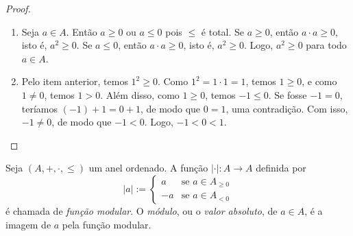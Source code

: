 \begin{proof}
\begin{enumerate}[leftmargin=*, align=left, label=\textbf{(\alph*)}]
\begin{enumerate}[label=\roman*.]
                    \item Se $a \leq 0$, então $-a \geq 0$, de modo que, como $b \geq 0$, temos $(-a) \cdot b \geq 0$, isto é, $-(a \cdot b) \geq 0$. Logo, $-(-(a \cdot b)) \leq 0$, isto é, $a \cdot b \leq 0$.
                    \item Se $a \leq 0$ e $b \leq 0$, então $-a \geq 0$ e $-b \geq 0$, de modo que $(-a) \cdot (-b) \geq 0$, isto é, $a \cdot b \geq 0$.
                \end{enumerate}
            \blackproof
            \item Seja $a \in A$. Então $a \geq 0$ ou $a \leq 0$ pois $\leq$ é total. Se $a \geq 0$, então $a \cdot a \geq 0$, isto é, $a^2 \geq 0$. Se $a \leq 0$, então $a \cdot a \geq 0$, isto é, $a^2 \geq 0$. Logo, $a^2 \geq 0$ para todo $a \in A$. \blackproof
            \item Pelo item anterior, temos $1^2 \geq 0$. Como $1^2 = 1 \cdot 1 = 1$, temos $1 \geq 0$, e como $1 \neq 0$, temos $1 > 0$. Além disso, como $1 \geq 0$, temos $-1 \leq 0$. Se fosse $-1 = 0$, teríamos $(-1) + 1 = 0 + 1$, de modo que $0 = 1$, uma contradição. Com isso, $-1 \neq 0$, de modo que $-1 < 0$. Logo, $-1 < 0 < 1$. \blackproof
        \end{enumerate}
\end{proof}

\begin{definition}
    Seja $(A, +, \cdot, \leq)$ um anel ordenado. A função $|\cdot| : A \to A$ definida por
        \[ |a| :=
            \begin{cases}
                a & \text{se }  a \in A_{\geq 0} \\
                -a & \text{se } a \in A_{<0}
            \end{cases}
        \]
    é chamada de \emph{função modular}. O \emph{módulo}, ou o \emph{valor absoluto}, de $a \in A$, é a imagem de $a$ pela função modular.
\end{definition}

